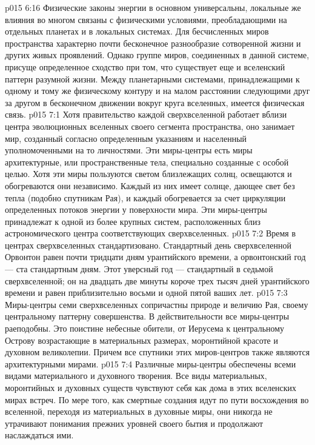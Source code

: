 \vs p015 6:16 Физические законы энергии в основном универсальны, локальные же влияния во многом связаны с физическими условиями, преобладающими на отдельных планетах и в локальных системах. Для бесчисленных миров пространства характерно почти бесконечное разнообразие сотворенной жизни и других живых проявлений. Однако группе миров, соединенных в данной системе, присуще определенное сходство при том, что существует еще и вселенский паттерн разумной жизни. Между планетарными системами, принадлежащими к одному и тому же физическому контуру и на малом расстоянии следующими друг за другом в бесконечном движении вокруг круга вселенных, имеется физическая связь.
\vs p015 7:1 Хотя правительство каждой сверхвселенной работает вблизи центра эволюционных вселенных своего сегмента пространства, оно занимает мир, созданный согласно определенным указаниям и населенный уполномоченными на то личностями. Эти миры\hyp{}центры есть миры архитектурные, или пространственные тела, специально созданные с особой целью. Хотя эти миры пользуются светом близлежащих солнц, освещаются и обогреваются они независимо. Каждый из них имеет солнце, дающее свет без тепла (подобно спутникам Рая), и каждый обогревается за счет циркуляции определенных потоков энергии у поверхности мира. Эти миры\hyp{}центры принадлежат к одной из более крупных систем, расположенных близ астрономического центра соответствующих сверхвселенных.
\vs p015 7:2 \pc Время в центрах сверхвселенных стандартизовано. Стандартный день сверхвселенной Орвонтон равен почти тридцати дням урантийского времени, а орвонтонский год --- ста стандартным дням. Этот уверсный год --- стандартный в седьмой сверхвселенной; он на двадцать две минуты короче трех тысяч дней урантийского времени и равен приблизительно восьми и одной пятой ваших лет.
\vs p015 7:3 \pc Миры\hyp{}центры семи сверхвселенных сопричастны природе и величию Рая, своему центральному паттерну совершенства. В действительности все миры\hyp{}центры раеподобны. Это поистине небесные обители, от Иерусема к центральному Острову возрастающие в материальных размерах, моронтийной красоте и духовном великолепии. Причем все спутники этих миров\hyp{}центров также являются архитектурными мирами.
\vs p015 7:4 Различные миры\hyp{}центры обеспечены всеми видами материального и духовного творения. Все виды материальных, моронтийных и духовных существ чувствуют себя как дома в этих вселенских мирах встреч. По мере того, как смертные создания идут по пути восхождения во вселенной, переходя из материальных в духовные миры, они никогда не утрачивают понимания прежних уровней своего бытия и продолжают наслаждаться ими.
